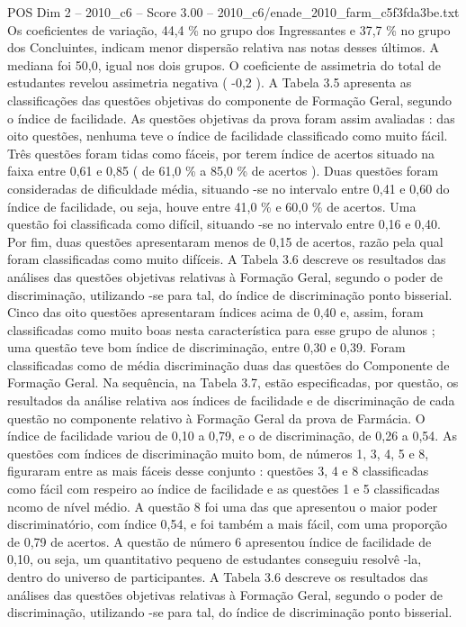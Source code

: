 \begin{textsample}{POS Dim 2 – 2010\_c6 – Score 3.00 – 2010\_c6/enade\_2010\_farm\_c5f3fda3be.txt}
Os coeficientes de variação, 44,4 \% no grupo dos Ingressantes e 37,7 \% no grupo dos Concluintes, indicam menor dispersão relativa nas notas desses últimos.
A mediana foi 50,0, igual nos dois grupos.
O coeficiente de assimetria do total de estudantes revelou assimetria negativa ( -0,2 ).
A Tabela 3.5 apresenta as classificações das questões objetivas do componente de Formação Geral, segundo o índice de facilidade.
As questões objetivas da prova foram assim avaliadas : das oito questões, nenhuma teve o índice de facilidade classificado como muito fácil.
Três questões foram tidas como fáceis, por terem índice de acertos situado na faixa entre 0,61 e 0,85 ( de 61,0 \% a 85,0 \% de acertos ).
Duas questões foram consideradas de dificuldade média, situando -se no intervalo entre 0,41 e 0,60 do índice de facilidade, ou seja, houve entre 41,0 \% e 60,0 \% de acertos.
Uma questão foi classificada como difícil, situando -se no intervalo entre 0,16 e 0,40.
Por fim, duas questões apresentaram menos de 0,15 de acertos, razão pela qual foram classificadas como muito difíceis.
A Tabela 3.6 descreve os resultados das análises das questões objetivas relativas à Formação Geral, segundo o poder de discriminação, utilizando -se para tal, do índice de discriminação ponto bisserial.
Cinco das oito questões apresentaram índices acima de 0,40 e, assim, foram classificadas como muito boas nesta característica para esse grupo de alunos ; uma questão teve bom índice de discriminação, entre 0,30 e 0,39.
Foram classificadas como de média discriminação duas das questões do Componente de Formação Geral.
Na sequência, na Tabela 3.7, estão especificadas, por questão, os resultados da análise relativa aos índices de facilidade e de discriminação de cada questão no componente relativo à Formação Geral da prova de Farmácia.
O índice de facilidade variou de 0,10 a 0,79, e o de discriminação, de 0,26 a 0,54.
As questões com índices de discriminação muito bom, de números 1, 3, 4, 5 e 8, figuraram entre as mais fáceis desse conjunto : questões 3, 4 e 8 classificadas como fácil com respeiro ao índice de facilidade e as questões 1 e 5 classificadas ncomo de nível médio.
A questão 8 foi uma das que apresentou o maior poder discriminatório, com índice 0,54, e foi também a mais fácil, com uma proporção de 0,79 de acertos.
A questão de número 6 apresentou índice de facilidade de 0,10, ou seja, um quantitativo pequeno de estudantes conseguiu resolvê -la, dentro do universo de participantes.
A Tabela 3.6 descreve os resultados das análises das questões objetivas relativas à Formação Geral, segundo o poder de discriminação, utilizando -se para tal, do índice de discriminação ponto bisserial.

\end{textsample}
